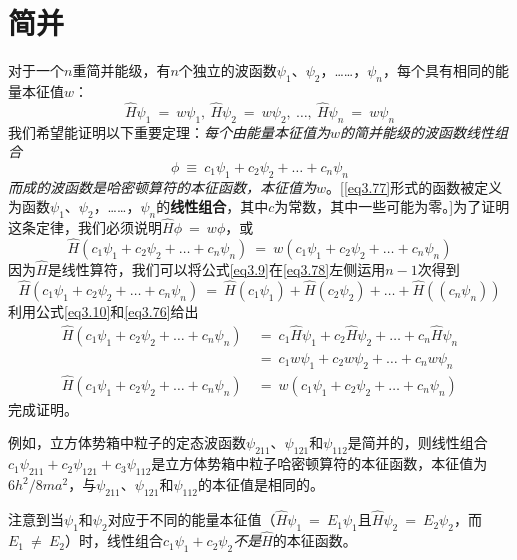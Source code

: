 \documentclass[12pt,a4paper,openany]{ctexbook}
\begin{document}
\section{简并}
\begin{flushleft}
    \setlength{\parindent}{2em}
对于一个$n$重简并能级，有$n$个独立的波函数$\psi_1$、$\psi_2$，……，$\psi_n$，每个具有相同的能量本征值$w$：
\begin{equation}
    \hat{H}\psi_1\ =\ w\psi_1,\ \hat{H}\psi_2\ =\ w\psi_2,\ \dots,\ \hat{H}\psi_n\ =\ w\psi_n \label{eq3.76}
\end{equation}
我们希望能证明以下重要定理：\textit{每个由能量本征值为$w$的简并能级的波函数线性组合}
\begin{equation}
    \phi\ \equiv\ c_1\psi_1+c_2\psi_2+\dots+c_n\psi_n \label{eq3.77}
\end{equation}
\textit{而成的波函数是哈密顿算符的本征函数，本征值为$w$}。[\eqref{eq3.77}形式的函数被定义为函数$\psi_1$、$\psi_2$，……，$\psi_n$的\textbf{线性组合}，其中$c$为常数，其中一些可能为零。]为了证明这条定律，我们必须说明$\hat{H}\phi\ =\ w\phi$，或
\begin{equation}
    \hat{H}(c_1\psi_1+c_2\psi_2+\dots+c_n\psi_n)\ =\ w(c_1\psi_1+c_2\psi_2+\dots+c_n\psi_n) \label{eq3.78}
\end{equation}
因为$\hat{H}$是线性算符，我们可以将公式\eqref{eq3.9}在\eqref{eq3.78}左侧运用$n-1$次得到
\begin{equation*}
    \hat{H}(c_1\psi_1+c_2\psi_2+\dots+c_n\psi_n)\ =\ \hat{H}(c_1\psi_1)+\hat{H}(c_2\psi_2)+\dots+\hat{H}((c_n\psi_n))
\end{equation*}
利用公式\eqref{eq3.10}和\eqref{eq3.76}给出
\begin{align*}
    \hat{H}(c_1\psi_1+c_2\psi_2+\dots+c_n\psi_n)\ &=\ c_1\hat{H}\psi_1+c_2\hat{H}\psi_2+\dots+c_n\hat{H}\psi_n \\
    &=\ c_1w\psi_1+c_2w\psi_2+\dots+c_nw\psi_n \\
    \hat{H}(c_1\psi_1+c_2\psi_2+\dots+c_n\psi_n)\ &=\ w(c_1\psi_1+c_2\psi_2+\dots+c_n\psi_n)
\end{align*}
完成证明。

例如，立方体势箱中粒子的定态波函数$\psi_{211}$、$\psi_{121}$和$\psi_{112}$是简并的，则线性组合$c_1\psi_{211}+c_2\psi_{121}+c_3\psi_{112}$是立方体势箱中粒子哈密顿算符的本征函数，本征值为$6h^2/8ma^2$，与$\psi_{211}$、$\psi_{121}$和$\psi_{112}$的本征值是相同的。

注意到当$\psi_1$和$\psi_2$对应于不同的能量本征值（$\hat{H}\psi_1\ =\ E_1\psi_1$且$\hat{H}\psi_2\ =\ E_2\psi_2$，而$E_1\ \neq\ E_2$）时，线性组合$c_1\psi_1+c_2\psi_2$\textit{不是}$\hat{H}$的本征函数。


\end{flushleft}
\end{document}
